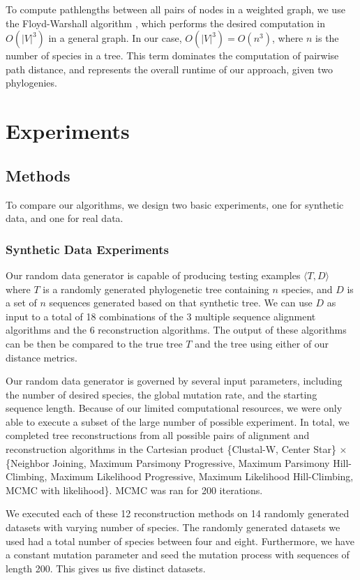 \documentclass[10pt,twocolumn]{article}
\begin{document}
To compute pathlengths between all pairs of nodes in a weighted graph, we use the Floyd-Warshall algorithm \cite{floyd1962algorithm}, which performs the desired computation in $O(|V|^3)$ in a general graph. In our case, $O(|V|^3) = O(n^3)$, where $n$ is the number of species in a tree. This term dominates the computation of pairwise path distance, and represents the overall runtime of our approach, given two phylogenies.

\section*{Experiments}

\subsection*{Methods}
To compare our algorithms, we design two basic experiments, one for synthetic data, and one for real
data.

\subsubsection*{Synthetic Data Experiments}
Our random data generator is capable of producing testing examples $\langle T, D \rangle$ where
$T$ is a randomly generated phylogenetic tree containing $n$ species, and $D$ is a set of $n$ 
sequences generated based on that synthetic tree. We can use $D$ as input to a total of 18
combinations of the 3 multiple sequence alignment algorithms and the 6 reconstruction algorithms.
The output of these algorithms can be then be compared to the true tree $T$ and the tree
using either of our distance metrics.

Our random data generator is governed by several input parameters, including the number of desired
species, the global mutation rate, and the starting sequence length. Because of our limited computational
resources, we were only able to execute a subset of the large number of possible experiment. In total, we
completed tree reconstructions from all possible pairs of alignment and reconstruction algorithms in the
Cartesian product \{Clustal-W, Center Star\} $\times$ \{Neighbor Joining, Maximum Parsimony Progressive,
Maximum Parsimony Hill-Climbing, Maximum Likelihood Progressive, Maximum Likelihood Hill-Climbing,
MCMC with likelihood\}. MCMC was ran for 200 iterations. 

We executed each of these 12 reconstruction methods on 14 randomly generated datasets with varying number of
species. The randomly generated datasets we used had a total number of species between four and eight.
Furthermore, we have a constant mutation parameter and seed the mutation process with sequences
of length 200. This gives us five distinct datasets.
\end{document}
